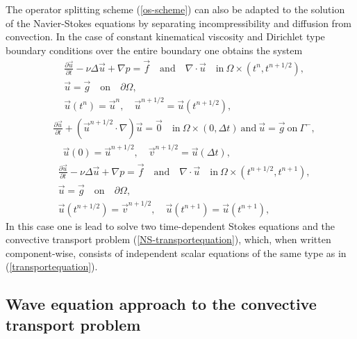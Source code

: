 The operator splitting scheme (\ref{os-scheme}) can also be adapted to the 
solution of the Navier-Stokes equations by separating incompressibility and 
diffusion from convection.
In the case of constant kinematical viscosity and Dirichlet type boundary 
conditions over the entire boundary one obtains the system \cite{DG97}  
\begin{equation}
\begin{split}
&\frac{\partial \vec u}{\partial t}-\nu\Delta\vec u+\nabla p = \vec f \quad 
\mathrm{and} \quad \nabla\cdot\vec u \quad
\mathrm{in}\ \Omega\times(t^n,t^{n+1/2}), \\ 
&\vec u = \vec g \quad \mathrm{on}\quad \partial\Omega, \\ 
&\vec u(t^n)=\vec u^n, \quad \vec u^{n+1/2}=\vec u(t^{n+1/2}), 
\end{split}
\end{equation}
\begin{equation}\label{NS-transportequation}
\begin{split}
&\frac{\partial \vec u}{\partial t}+(\vec u^{n+1/2}\cdot\nabla)\vec u=\vec 0 
\quad \mathrm{in}\ \Omega \times (0,\Delta t) \ \mathrm{and} \ \vec u=\vec g \ 
\mathrm{on}\ \Gamma^-,  \\ 
&\quad \vec u(0)=\vec u^{n+1/2}, \quad \vec{v}^{n+1/2}=\vec u(\Delta t),
\end{split}
\end{equation}
\begin{equation}
\begin{split}
&\frac{\partial \vec u}{\partial t}-\nu\Delta\vec u+\nabla p = \vec f \quad 
\mathrm{and} \quad \nabla\cdot\vec u \quad
\mathrm{in}\ \Omega\times(t^{n+1/2},t^{n+1}), \\ 
&\vec u = \vec g \quad \mathrm{on}\quad \partial\Omega, \\ 
&\vec u(t^{n+1/2})=\vec{v}^{n+1/2}, \quad \vec u(t^{n+1})=\vec u(t^{n+1}), 
\end{split}
\end{equation}
In this case one is lead to solve two time-dependent Stokes equations and
the convective transport problem (\ref{NS-transportequation}), which, when
written component-wise, consists 
of independent scalar equations of the same type as in 
(\ref{transportequation}).
  

\subsection{Wave equation approach to the convective transport problem}
\label{Waveequationsection}

